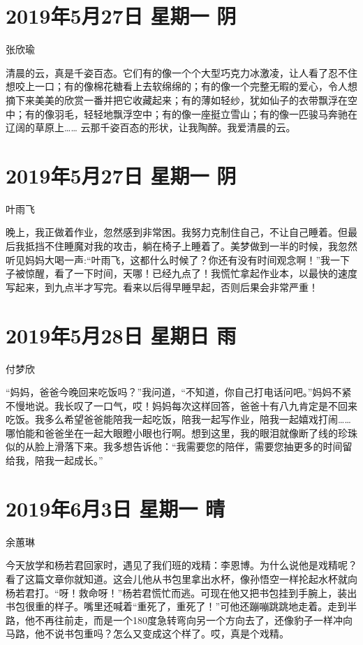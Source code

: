 \section{2019年5月27日 星期一 阴}

张欣瑜

清晨的云，真是千姿百态。它们有的像一个个大型巧克力冰激凌，让人看了忍不住想咬上一口；有的像棉花糖看上去软绵绵的；有的像一个完整无暇的爱心，令人想摘下来美美的欣赏一番并把它收藏起来；有的薄如轻纱，犹如仙子的衣带飘浮在空中；有的像羽毛，轻轻地飘浮空中；有的像一座挺立雪山；有的像一匹骏马奔驰在辽阔的草原上…… 云那千姿百态的形状，让我陶醉。我爱清晨的云。

\section{2019年5月27日 星期一 阴}

叶雨飞

晚上，我正做着作业，忽然感到非常困。我努力克制住自己，不让自己睡着。但最后我抵挡不住睡魔对我的攻击，躺在椅子上睡着了。美梦做到一半的时候，我忽然听见妈妈大喝一声:“叶雨飞，这都什么时候了？你还有没有时间观念啊！”我一下子被惊醒，看了一下时间，天哪！已经九点了！我慌忙拿起作业本，以最快的速度写起来，到九点半才写完。看来以后得早睡早起，否则后果会非常严重！

\section{2019年5月28日 星期日 雨}

付梦欣

“妈妈，爸爸今晚回来吃饭吗？”我问道，“不知道，你自己打电话问吧。”妈妈不紧不慢地说。我长叹了一口气，哎！妈妈每次这样回答，爸爸十有八九肯定是不回来吃饭。我多么希望爸爸能陪我一起吃饭，陪我一起写作业，陪我一起嬉戏打闹…… 哪怕能和爸爸坐在一起大眼瞪小眼也行啊。想到这里，我的眼泪就像断了线的珍珠似的从脸上滑落下来。我多想告诉他：“我需要您的陪伴，需要您抽更多的时间留给我，陪我一起成长。”

\section{2019年6月3日 星期一 晴}

余蕙琳

今天放学和杨若君回家时，遇见了我们班的戏精：李恩博。为什么说他是戏精呢？看了这篇文章你就知道。这会儿他从书包里拿出水杯，像孙悟空一样抡起水杯就向杨若君打。“呀！救命呀！”杨若君慌忙而逃。可现在他又把书包挂到手腕上，装出书包很重的样子。嘴里还喊着“重死了，重死了！”可他还蹦嘣跳跳地走着。走到半路，他不再往前走，而是一个180度急转弯向另一个方向去了，还像豹子一样冲向马路，他不说书包重吗？怎么又变成这个样了。哎，真是个戏精。

